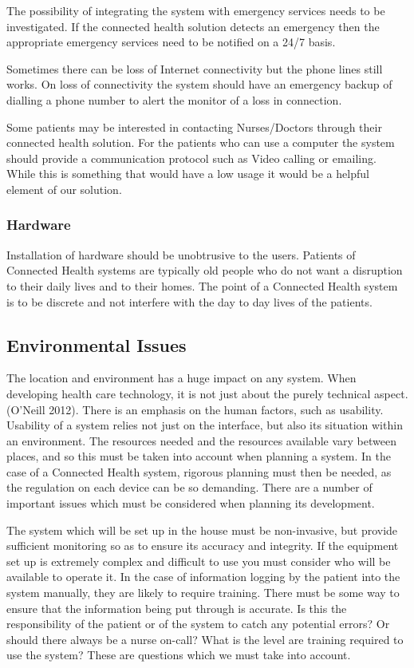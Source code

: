 The possibility of integrating the system with emergency services needs to be investigated. If the connected health solution detects an emergency then  the appropriate emergency services need to be notified on a 24/7 basis. 

Sometimes there can be loss of Internet connectivity but the phone lines still works. On loss of connectivity the system should have an emergency backup of dialling a phone number to alert the monitor of a loss in connection. 

Some patients may be interested in contacting Nurses/Doctors through their connected health solution. For the patients who can use a computer the system should provide a communication protocol such as Video calling or emailing. While this is something that would have a low usage it would be a helpful element of our solution.

\subsubsection{Hardware}

Installation of hardware should be unobtrusive to the users. Patients of Connected Health systems are typically old people who do not want a disruption to their daily lives and to their homes. The point of a Connected Health system is to be discrete and not interfere with the day to day lives of the patients.

\subsection{Environmental Issues}

The location and environment has a huge impact on any system. When developing health care technology, it is not just about the purely technical aspect. (O’Neill 2012). There is an emphasis on the human factors, such as usability. Usability of a system relies not just on the interface, but also its situation within an environment. The resources needed and the resources available vary between places, and so this must be taken into account when planning a system. In the case of a Connected Health system, rigorous planning must then be needed, as the regulation on each device can be so demanding. There are a number of important issues which must be considered when planning its development.

The system which will be set up in the house must be non-invasive, but provide sufficient monitoring so as to ensure its accuracy and integrity. If the equipment set up is extremely complex and difficult to use you must consider who will be available to operate it. In the case of information logging by the patient into the system manually, they are likely to require training. There must be some way to ensure that the information being put through is accurate. Is this the responsibility of the patient or of the system to catch any potential errors? Or should there always be a nurse on-call? What is the level are training required to use the system? These are questions which we must take into account.


